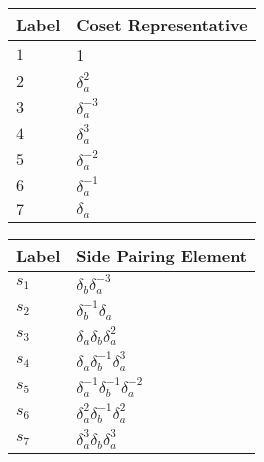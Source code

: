 \documentclass{article}
\begin{document}
\begin{center}
\begin{tabular}{ll}
\toprule
Label & Coset Representative\\
\midrule
$1$ & 1 \\
$2$ & $\delta_a^{2}$ \\
$3$ & $\delta_a^{-3}$ \\
$4$ & $\delta_a^{3}$ \\
$5$ & $\delta_a^{-2}$ \\
$6$ & $\delta_a^{-1}$ \\
$7$ & $\delta_a^{}$ \\
\bottomrule
\end{tabular}
\hfill
\begin{tabular}{ll}
\toprule
Label & Side Pairing Element\\
\midrule
$s_{1}$ & $\delta_b^{}\delta_a^{-3}$ \\
$s_{2}$ & $\delta_b^{-1}\delta_a^{}$ \\
$s_{3}$ & $\delta_a^{}\delta_b^{}\delta_a^{2}$ \\
$s_{4}$ & $\delta_a^{}\delta_b^{-1}\delta_a^{3}$ \\
$s_{5}$ & $\delta_a^{-1}\delta_b^{-1}\delta_a^{-2}$ \\
$s_{6}$ & $\delta_a^{2}\delta_b^{-1}\delta_a^{2}$ \\
$s_{7}$ & $\delta_a^{3}\delta_b^{}\delta_a^{3}$ \\
\bottomrule
\end{tabular}
\end{center}

\thispagestyle{empty}
\end{document}
